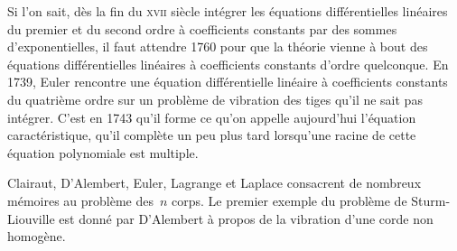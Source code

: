 \begin{histoire}
\medskip
Si l'on sait, dès la fin du \textsc{xvii} siècle intégrer les équations différentielles linéaires du premier et du second ordre à coefficients constants par des sommes d'exponentielles, il faut attendre 1760 pour que la théorie vienne à bout des équations différentielles linéaires à coefficients constants d'ordre quelconque. En 1739, Euler rencontre une équation différentielle linéaire à coefficients constants du quatrième ordre sur un problème de vibration des tiges qu'il ne sait pas intégrer. C'est en 1743 qu'il forme ce qu'on appelle aujourd'hui l'équation caractéristique, qu'il complète un peu plus tard lorsqu'une racine de cette équation polynomiale est multiple.

\medskip
{}

\medskip
Clairaut, D'Alembert, Euler, Lagrange et Laplace consacrent de nombreux mémoires au problème des~$n$ corps. Le premier exemple du problème de Sturm-Liouville est donné par D'Alembert à propos de la vibration d'une corde non homogène.
\end{histoire}


